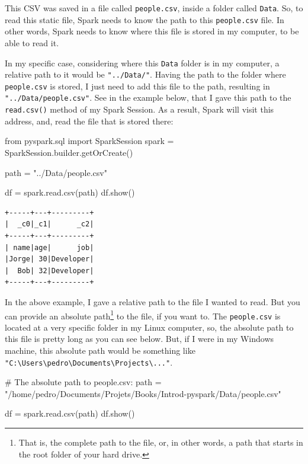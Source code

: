 \documentclass[
  11pt,
  letterpaper,
  DIV=11,
  numbers=noendperiod]{scrreprt}
\newenvironment{Shaded}{\begin{snugshade}}{\end{snugshade}}
\newcommand{\CommentTok}[1]{\textcolor[rgb]{0.37,0.37,0.37}{#1}}
\newcommand{\ImportTok}[1]{\textcolor[rgb]{0.00,0.46,0.62}{#1}}
\newcommand{\NormalTok}[1]{\textcolor[rgb]{0.00,0.23,0.31}{#1}}
\newcommand{\OperatorTok}[1]{\textcolor[rgb]{0.37,0.37,0.37}{#1}}
\newcommand{\StringTok}[1]{\textcolor[rgb]{0.13,0.47,0.30}{#1}}
\begin{document}
This CSV was saved in a file called \texttt{people.csv}, inside a folder
called \texttt{Data}. So, to read this static file, Spark needs to know
the path to this \texttt{people.csv} file. In other words, Spark needs
to know where this file is stored in my computer, to be able to read it.

In my specific case, considering where this \texttt{Data} folder is in
my computer, a relative path to it would be \texttt{"../Data/"}. Having
the path to the folder where \texttt{people.csv} is stored, I just need
to add this file to the path, resulting in
\texttt{"../Data/people.csv"}. See in the example below, that I gave
this path to the \texttt{read.csv()} method of my Spark Session. As a
result, Spark will visit this address, and, read the file that is stored
there:

\begin{Shaded}
\begin{Highlighting}[]
\ImportTok{from}\NormalTok{ pyspark.sql }\ImportTok{import}\NormalTok{ SparkSession}
\NormalTok{spark }\OperatorTok{=}\NormalTok{ SparkSession.builder.getOrCreate()}

\NormalTok{path }\OperatorTok{=} \StringTok{"../Data/people.csv"}

\NormalTok{df }\OperatorTok{=}\NormalTok{ spark.read.csv(path)}
\NormalTok{df.show()}
\end{Highlighting}
\end{Shaded}

\begin{verbatim}
+-----+---+---------+
|  _c0|_c1|      _c2|
+-----+---+---------+
| name|age|      job|
|Jorge| 30|Developer|
|  Bob| 32|Developer|
+-----+---+---------+
\end{verbatim}

In the above example, I gave a relative path to the file I wanted to
read. But you can provide an absolute path\footnote{That is, the
  complete path to the file, or, in other words, a path that starts in
  the root folder of your hard drive.} to the file, if you want to. The
\texttt{people.csv} is located at a very specific folder in my Linux
computer, so, the absolute path to this file is pretty long as you can
see below. But, if I were in my Windows machine, this absolute path
would be something like
\texttt{"C:\textbackslash{}Users\textbackslash{}pedro\textbackslash{}Documents\textbackslash{}Projects\textbackslash{}..."}.

\begin{Shaded}
\begin{Highlighting}[]
\CommentTok{\# The absolute path to \textasciigrave{}people.csv\textasciigrave{}:}
\NormalTok{path }\OperatorTok{=} \StringTok{"/home/pedro/Documents/Projets/Books/Introd{-}pyspark/Data/people.csv"}

\NormalTok{df }\OperatorTok{=}\NormalTok{ spark.read.csv(path)}
\NormalTok{df.show()}
\end{Highlighting}
\end{Shaded}
\end{document}

